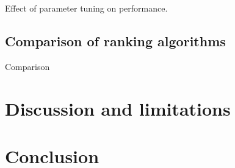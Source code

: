 \documentclass[english]{article}
\theoremstyle{definition}
\begin{document}
\begin{multicols}{2}
Effect of parameter tuning on performance.  

\subsection{Comparison of ranking algorithms}

Comparison

\section{Discussion and limitations}

\section{Conclusion}

\newpage
\medskip



\end{multicols}
\end{document}
